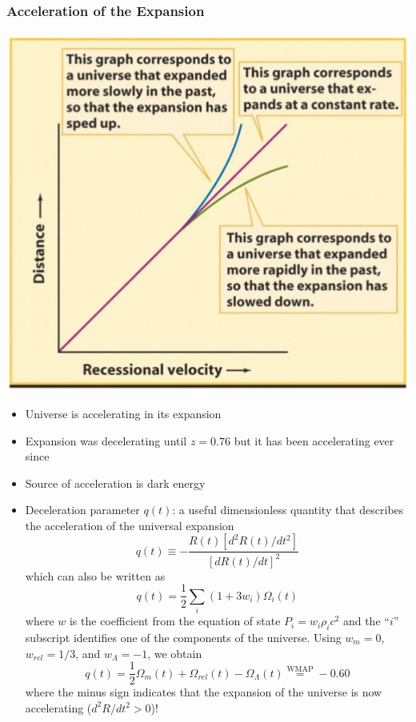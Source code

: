 \documentclass{book}
\begin{document}
\subsubsection{Acceleration of the Expansion}
\begin{center}
    \includegraphics[height = 0.4 \textwidth]{images/accel_exp.png}
\end{center}
\begin{itemize}
    \item Universe is accelerating in its expansion
    \item Expansion was decelerating until $z=0.76$ but it has been accelerating ever since
    \item Source of acceleration is dark energy
    \item Deceleration parameter $q(t)$: a useful dimensionless quantity that describes the acceleration of the universal expansion
          \begin{equation*}
              q(t) \equiv - \frac{R(t) [d^2 R (t)/dt^2]}{[dR(t)/dt]^2} \tag{C\&O 29.54}
          \end{equation*}
          which can also be written as
          \begin{equation*}
              q(t) = \frac{1}{2} \sum_i (1 + 3w_i) \Omega_i (t) \tag{C\&O 29.123}
          \end{equation*}
          where $w$ is the coefficient from the equation of state $P_i = w_i \rho_i c^2$ and the ``$i$'' subscript identifies one of the components of the universe. Using $w_m = 0$, $w_{rel} = 1/3$, and $w_\Lambda = -1$, we obtain
          \begin{equation*}
              q(t) = \frac{1}{2} \Omega_m (t) + \Omega_{rel} (t) - \Omega_\Lambda (t) \overset{\text{WMAP}}{=} -0.60 \tag{C\&O 29.124}
          \end{equation*}
          where the minus sign indicates that the expansion of the universe is now accelerating ($d^2R/dt^2 >0$)!
\end{itemize}
\end{document}
